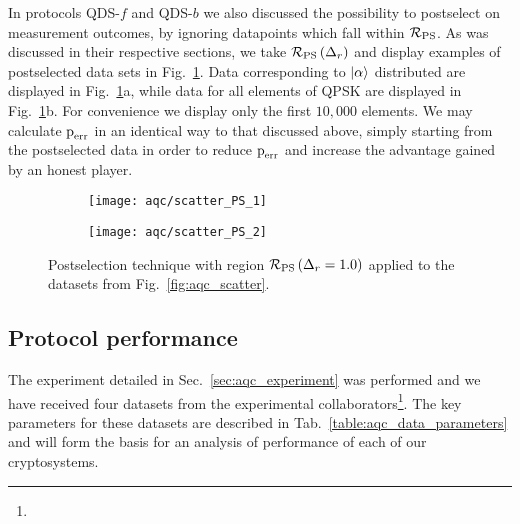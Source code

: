 In protocols QDS-$f$ and QDS-$b$ we also discussed the possibility to postselect on measurement outcomes, by ignoring datapoints which fall within $\mathcal{R}_{\text{PS}}$. As was discussed in their respective sections, we take $\mathcal{R}_{\text{PS}}\left(\Delta_r\right)$ and display examples of postselected data sets in Fig.~\ref{fig:aqc_ps}. Data corresponding to $\ket{\alpha}$ distributed are displayed in Fig.~\ref{fig:aqc_ps}a, while data for all elements of QPSK are displayed in Fig.~\ref{fig:aqc_ps}b. For convenience we display only the first $10,000$ elements. We may calculate $\text{p}_{\text{err}}$ in an identical way to that discussed above, simply starting from the postselected data in order to reduce $\text{p}_{\text{err}}$ and increase the advantage gained by an honest player.

\begin{figure}[htp]
\centering
	\begin{subfigure}{0.49\linewidth}
	\centering
	\texttt{[image: aqc/scatter\_PS\_1]}
	\caption{}
	\end{subfigure}
	\begin{subfigure}{0.49\linewidth}
	\centering
	\texttt{[image: aqc/scatter\_PS\_2]}
	\caption{}
	\end{subfigure}
\caption{\label{fig:aqc_ps} Postselection technique with region $\mathcal{R}_{\text{PS}}\left(\Delta_r=1.0\right)$ applied to the datasets from Fig.~\ref{fig:aqc_scatter}.}
\end{figure}


\clearpage
\subsection{Protocol performance}
The experiment detailed in Sec.~\ref{sec:aqc_experiment} was  performed and we have received four datasets from the experimental collaborators\footnote{}. The key parameters for these datasets are described in Tab.~\ref{table:aqc_data_parameters} and will form the basis for an analysis of performance of each of our cryptosystems.

